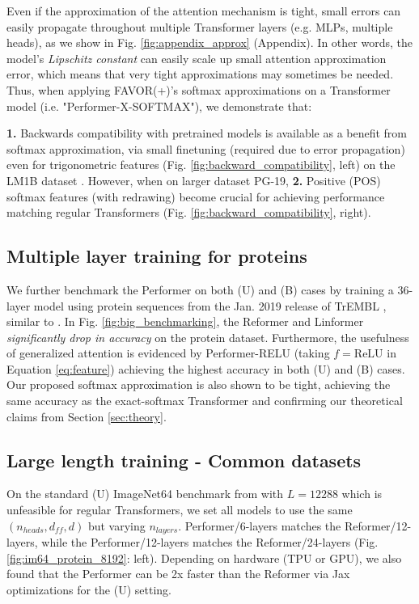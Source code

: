 Even if the approximation of the attention mechanism is tight, small errors can easily propagate throughout multiple Transformer layers (e.g. MLPs, multiple heads), as we show in Fig. \ref{fig:appendix_approx} (Appendix). In other words, the model's \textit{Lipschitz constant} can easily scale up small attention approximation error, which means that very tight approximations may sometimes be needed. Thus, when applying FAVOR(+)'s softmax approximations on a Transformer model (i.e. "Performer-X-SOFTMAX"), we demonstrate that: 

\textbf{1.} Backwards compatibility with pretrained models is available as a benefit from softmax approximation, via small finetuning (required due to error propagation) even for trigonometric features (Fig. \ref{fig:backward_compatibility}, left) on the LM1B dataset \citep{lm1b}. However, when on larger dataset PG-19, \textbf{2.} Positive (POS) softmax features (with redrawing) become crucial for achieving performance matching regular Transformers (Fig. \ref{fig:backward_compatibility}, right). 

\subsection{Multiple layer training for proteins} We further benchmark the Performer on both (U) and (B) cases by training a 36-layer model using protein sequences from the Jan. 2019 release of TrEMBL \citep{uniprot2019uniprot}, similar to \citep{progen}. In Fig. \ref{fig:big_benchmarking}, the Reformer and Linformer \textit{significantly drop in accuracy} on the protein dataset. Furthermore, the usefulness of generalized attention is evidenced by Performer-RELU (taking $f=\mathrm{ReLU}$ in Equation \ref{eq:feature}) achieving the highest accuracy in both (U) and (B) cases. Our proposed softmax approximation is also shown to be tight, achieving the same accuracy as the exact-softmax Transformer and confirming our theoretical claims from Section \ref{sec:theory}. 

\subsection{Large length training - Common datasets} On the standard (U) ImageNet64 benchmark from \citep{parmar} with $L = 12288$ which is unfeasible for regular Transformers, we set all models to use the same $(n_{heads}, d_{ff}, d)$ but varying $n_{layers}$. Performer/6-layers matches the Reformer/12-layers, while the Performer/12-layers matches the Reformer/24-layers (Fig. \ref{fig:im64_protein_8192}: left). Depending on hardware (TPU or GPU), we also found that the Performer can be 2x faster than the Reformer via Jax optimizations for the (U) setting. 

